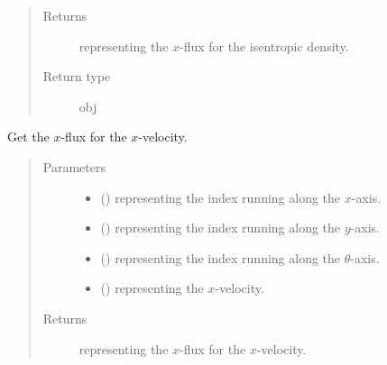 \documentclass[letterpaper,10pt,english]{sphinxmanual}
\begin{document}
\begin{fulllineitems}
\begin{fulllineitems}
\begin{quote}
\begin{description}
\begin{itemize}
\end{itemize}

\item[{Returns}] \leavevmode
{} representing the \(x\)-flux for the isentropic density.

\item[{Return type}] \leavevmode
obj

\end{description}\end{quote}

\end{fulllineitems}


\begin{fulllineitems}
\label{\detokenize{api:tasmania.dycore.flux_isentropic_nonconservative_centered.FluxIsentropicNonconservativeCentered._get_centered_flux_x_u}}
Get the \(x\)-flux for the \(x\)-velocity.
\begin{quote}\begin{description}
\item[{Parameters}] \leavevmode\begin{itemize}
\item {} 
 () \textendash{}  representing the index running along the \(x\)-axis.

\item {} 
 () \textendash{}  representing the index running along the \(y\)-axis.

\item {} 
 () \textendash{}  representing the index running along the \(\theta\)-axis.

\item {} 
 () \textendash{}  representing the \(x\)-velocity.

\end{itemize}

\item[{Returns}] \leavevmode
{} representing the \(x\)-flux for the \(x\)-velocity.


\end{description}
\end{quote}
\end{fulllineitems}
\end{fulllineitems}
\end{document}
